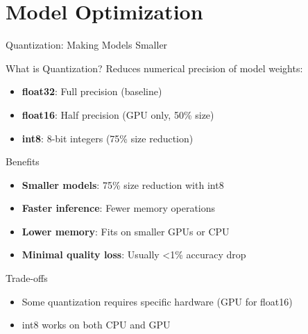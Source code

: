 \section{Model Optimization}
\begin{frame}{Quantization: Making Models Smaller}
\begin{block}{What is Quantization?}
Reduces numerical precision of model weights:
\begin{itemize}
  \item \textbf{float32}: Full precision (baseline)
  \item \textbf{float16}: Half precision (GPU only, 50\% size)
  \item \textbf{int8}: 8-bit integers (75\% size reduction)
\end{itemize}
\end{block}

\begin{block}{Benefits}
\begin{itemize}
  \item \textbf{Smaller models}: 75\% size reduction with int8
  \item \textbf{Faster inference}: Fewer memory operations
  \item \textbf{Lower memory}: Fits on smaller GPUs or CPU
  \item \textbf{Minimal quality loss}: Usually <1\% accuracy drop
\end{itemize}
\end{block}

\begin{block}{Trade-offs}
\begin{itemize}
  \item Some quantization requires specific hardware (GPU for float16)
  \item int8 works on both CPU and GPU
\end{itemize}
\end{block}
\end{frame}

